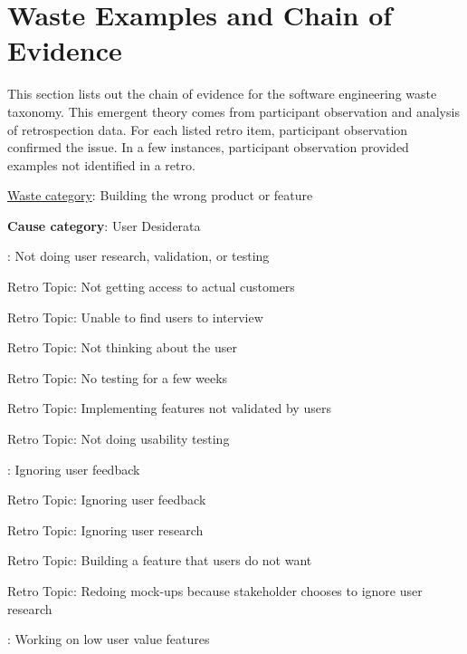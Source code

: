 
\chapter{Waste Examples and Chain of Evidence}

This section lists out the chain of evidence for the software engineering waste taxonomy. This emergent theory comes from participant observation and analysis of retrospection data. For each listed retro item, participant observation confirmed the issue. In a few instances, participant observation provided examples not identified in a retro.




\underline{Waste category}: Building the wrong product or feature

\quad \textbf{Cause category}: User Desiderata

\quad {}: Not doing user research, validation, or testing

\quad \quad \quad Retro Topic: Not getting access to actual customers

\quad \quad \quad Retro Topic: Unable to find users to interview

\quad \quad \quad Retro Topic: Not thinking about the user

\quad \quad \quad Retro Topic: No testing for a few weeks

\quad \quad \quad Retro Topic: Implementing features not validated by users

\quad \quad \quad Retro Topic: Not doing usability testing

\quad {}: Ignoring user feedback

\quad \quad \quad Retro Topic: Ignoring user feedback

\quad \quad \quad Retro Topic: Ignoring user research

\quad \quad \quad Retro Topic: Building a feature that users do not want

\quad \quad \quad Retro Topic: Redoing mock-ups because stakeholder chooses to ignore user research

\quad {}: Working on low user value features

